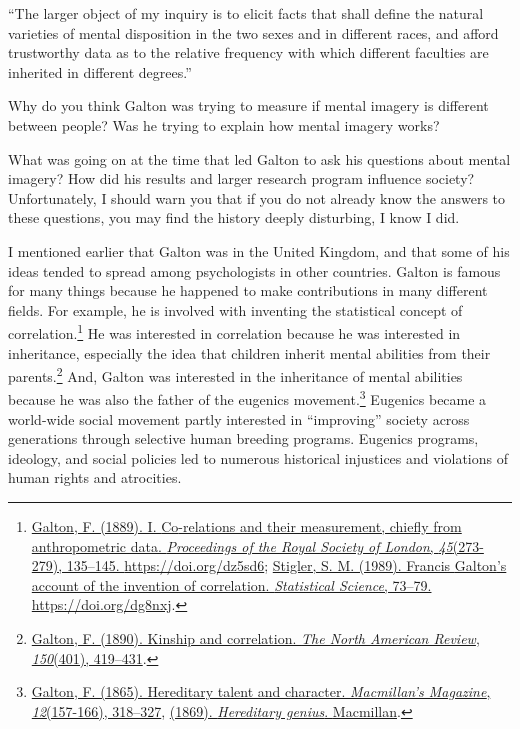 \documentclass[
  oneside,
  12pt]{crumpbook}
\begin{document}
``The larger object of my inquiry is to elicit facts that shall define the natural varieties of mental disposition in the two sexes and in different races, and afford trustworthy data as to the relative frequency with which different faculties are inherited in different degrees.''

Why do you think Galton was trying to measure if mental imagery is different between people? Was he trying to explain how mental imagery works?

What was going on at the time that led Galton to ask his questions about mental imagery? How did his results and larger research program influence society? Unfortunately, I should warn you that if you do not already know the answers to these questions, you may find the history deeply disturbing, I know I did.

I mentioned earlier that Galton was in the United Kingdom, and that some of his ideas tended to spread among psychologists in other countries. Galton is famous for many things because he happened to make contributions in many different fields. For example, he is involved with inventing the statistical concept of correlation.\footnote{\protect\hyperlink{ref-galtonCorelationsTheirMeasurement1889}{Galton, F. (1889). I. {Co}-relations and their measurement, chiefly from anthropometric data. \emph{Proceedings of the Royal Society of London}, \emph{45}(273-279), 135--145. \url{https://doi.org/dz5sd6}}; \protect\hyperlink{ref-stiglerFrancisGaltonAccount1989}{Stigler, S. M. (1989). Francis {Galton}'s account of the invention of correlation. \emph{Statistical Science}, 73--79. \url{https://doi.org/dg8nxj}}.} He was interested in correlation because he was interested in inheritance, especially the idea that children inherit mental abilities from their parents.\footnote{\protect\hyperlink{ref-galtonKinshipCorrelation1890}{Galton, F. (1890). Kinship and correlation. \emph{The North American Review}, \emph{150}(401), 419--431}.} And, Galton was interested in the inheritance of mental abilities because he was also the father of the eugenics movement.\footnote{\protect\hyperlink{ref-galtonHereditaryTalentCharacter1865}{Galton, F. (1865). Hereditary talent and character. \emph{Macmillan's Magazine}, \emph{12}(157-166), 318--327}, \protect\hyperlink{ref-galtonHereditaryGenius1869}{(1869). \emph{Hereditary genius}. {Macmillan}}.} Eugenics became a world-wide social movement partly interested in ``improving'' society across generations through selective human breeding programs. Eugenics programs, ideology, and social policies led to numerous historical injustices and violations of human rights and atrocities.
\end{document}
